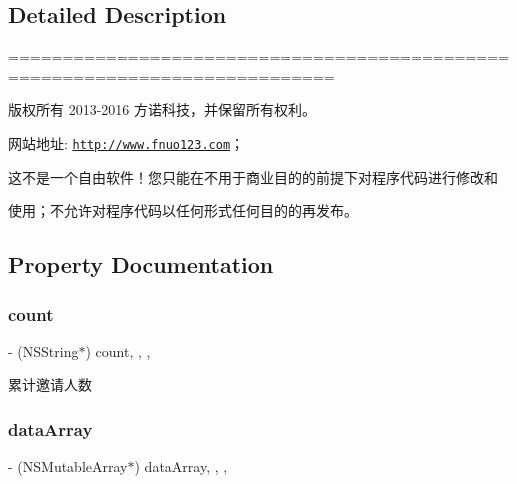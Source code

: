 \subsection{Detailed Description}
============================================================================

版权所有 2013-\/2016 方诺科技，并保留所有权利。

网站地址\+: \href{http://www.fnuo123.com}{\tt http\+://www.\+fnuo123.\+com}； 



这不是一个自由软件！您只能在不用于商业目的的前提下对程序代码进行修改和

使用；不允许对程序代码以任何形式任何目的的再发布。 

 

\subsection{Property Documentation}
\mbox{\label{category_invite_view_controller_07_08_a49e3c4700ad27f87c4b564a3707f653b}} 
\subsubsection{\texorpdfstring{count}{count}}
{\footnotesize\ttfamily -\/ (N\+S\+String$\ast$) count\hspace{0.3cm}{\ttfamily [read]}, {\ttfamily [write]}, {\ttfamily [nonatomic]}, {\ttfamily [strong]}}

累计邀请人数 \mbox{\label{category_invite_view_controller_07_08_ac900282e16e43ca1d6481206d6b287b9}} 
\subsubsection{\texorpdfstring{data\+Array}{dataArray}}
{\footnotesize\ttfamily -\/ (N\+S\+Mutable\+Array$\ast$) data\+Array\hspace{0.3cm}{\ttfamily [read]}, {\ttfamily [write]}, {\ttfamily [nonatomic]}, {\ttfamily [strong]}}

